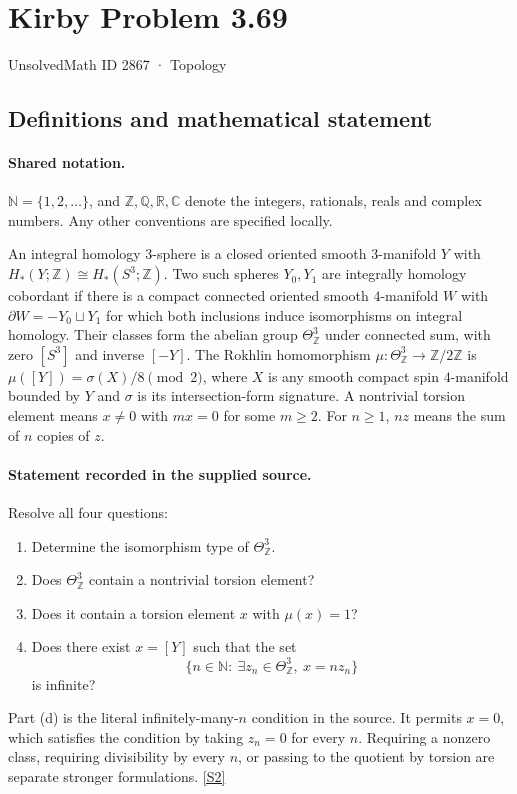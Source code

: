 \documentclass[11pt]{article}
\newcommand{\sref}[2]{\hyperlink{source:#1:#2}{[S#2]}}
\begin{document}
\setcounter{section}{2866}
\section{Kirby Problem 3.69}\label{2867}
{\small\sffamily UnsolvedMath ID 2867 · Topology}
\subsection{Definitions and mathematical statement}

\paragraph{Shared notation.}$\mathbb N=\{1,2,\ldots\}$, and $\mathbb Z,\mathbb Q,\mathbb R,\mathbb C$ denote the integers, rationals, reals and complex numbers. Any other conventions are specified locally.


An integral homology $3$-sphere is a closed oriented smooth $3$-manifold $Y$ with $H_*(Y;\mathbb Z)\cong H_*(S^3;\mathbb Z)$. Two such spheres $Y_0,Y_1$ are integrally homology cobordant if there is a compact connected oriented smooth $4$-manifold $W$ with $\partial W=-Y_0\sqcup Y_1$ for which both inclusions induce isomorphisms on integral homology. Their classes form the abelian group $\Theta^3_{\mathbb Z}$ under connected sum, with zero $[S^3]$ and inverse $[-Y]$.
The Rokhlin homomorphism $\mu:\Theta^3_{\mathbb Z}\to\mathbb Z/2\mathbb Z$ is $\mu([Y])=\sigma(X)/8\pmod2$, where $X$ is any smooth compact spin $4$-manifold bounded by $Y$ and $\sigma$ is its intersection-form signature. A nontrivial torsion element means $x\ne0$ with $mx=0$ for some $m\ge2$. For $n\ge1$, $nz$ means the sum of $n$ copies of $z$.
\paragraph{Statement recorded in the supplied source.}
Resolve all four questions:
\begin{enumerate}
\item Determine the isomorphism type of $\Theta^3_{\mathbb Z}$.
\item Does $\Theta^3_{\mathbb Z}$ contain a nontrivial torsion element?
\item Does it contain a torsion element $x$ with $\mu(x)=1$?
\item Does there exist $x=[Y]$ such that the set
\[
\{n\in\mathbb N:\ \exists z_n\in\Theta^3_{\mathbb Z},\ x=nz_n\}
\]
is infinite?
\end{enumerate}
Part (d) is the literal infinitely-many-$n$ condition in the source. It permits $x=0$, which satisfies the condition by taking $z_n=0$ for every $n$. Requiring a nonzero class, requiring divisibility by every $n$, or passing to the quotient by torsion are separate stronger formulations. \sref{2867}{2}
\end{document}
